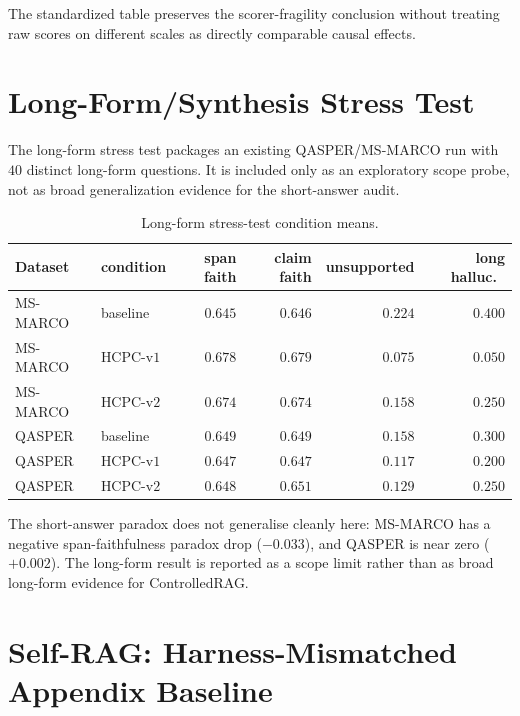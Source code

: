 \documentclass[11pt]{article}
\begin{document}
The standardized table preserves the scorer-fragility conclusion
without treating raw scores on different scales as directly comparable
causal effects.

\section{Long-Form/Synthesis Stress Test}
\label{supp:longform}

The long-form stress test packages an existing QASPER/MS-MARCO run
with $40$ distinct long-form questions. It is included only as an
exploratory scope probe, not as broad generalization evidence for the
short-answer audit.

\begin{table}[!htb]
\centering
\caption{Long-form stress-test condition means.}
\footnotesize
\begin{tabular}{llrrrr}
\toprule
Dataset & condition & span faith & claim faith & unsupported & long halluc.\ \\
\midrule
MS-MARCO & baseline   & $0.645$ & $0.646$ & $0.224$ & $0.400$ \\
MS-MARCO & HCPC-v$1$  & $0.678$ & $0.679$ & $0.075$ & $0.050$ \\
MS-MARCO & HCPC-v$2$  & $0.674$ & $0.674$ & $0.158$ & $0.250$ \\
QASPER   & baseline   & $0.649$ & $0.649$ & $0.158$ & $0.300$ \\
QASPER   & HCPC-v$1$  & $0.647$ & $0.647$ & $0.117$ & $0.200$ \\
QASPER   & HCPC-v$2$  & $0.648$ & $0.651$ & $0.129$ & $0.250$ \\
\bottomrule
\end{tabular}
\end{table}

The short-answer paradox does not generalise cleanly here: MS-MARCO has
a negative span-faithfulness paradox drop ($-0.033$), and QASPER is
near zero ($+0.002$). The long-form result is reported as a scope
limit rather than as broad long-form evidence for ControlledRAG.

\section{Self-RAG: Harness-Mismatched Appendix Baseline}
\label{supp:selfrag}
\end{document}
